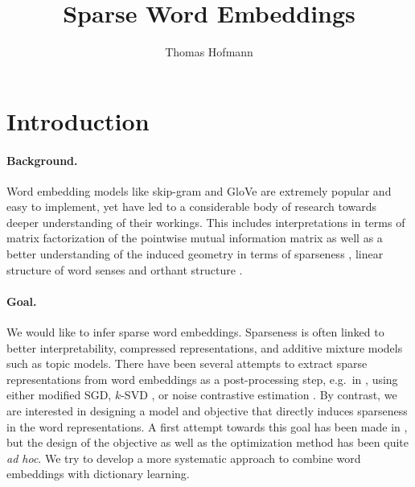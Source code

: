 \documentclass{article}
\title{
	Sparse Word Embeddings
}
\author{Thomas Hofmann}
\begin{document}
\maketitle 

\section{Introduction}

\paragraph{Background.} Word embedding models like skip-gram \cite{mikolov2013distributed} and GloVe \cite{pennington2014glove} are extremely popular and easy to implement, yet have led to a considerable body of research towards deeper understanding of their workings. This includes interpretations in terms of matrix factorization of the pointwise  mutual information matrix  \cite{levy2014neural,levy2015improving, melamud2017information} as well as a  better understanding of the induced geometry in terms of sparseness \cite{faruqui2015sparse,chen2016compressing}, linear structure of word senses \cite{arora2016linear,mu2016geometry} and orthant structure \cite{mimno2017strange}. 

\paragraph{Goal.} We would like to infer sparse word embeddings. Sparseness is often linked to better interpretability, compressed representations, and additive mixture models such as topic models. There have been several attempts to extract sparse representations from word embeddings as a post-processing step, e.g.~in \cite{faruqui2015sparse,arora2016linear,chen2016compressing}, using either modified SGD,  $k$-SVD \cite{aharon2006rm}, or noise contrastive estimation \cite{gutmann2012noise}. By contrast, we are interested in  designing a model and objective that directly induces sparseness in the word representations. A first attempt towards this goal has been made in \cite{chen2017learning}, but the design of the objective as well as the optimization method has been quite \textit{ad hoc}. We try to develop a more systematic approach to combine word embeddings with dictionary learning. 
\end{document}
